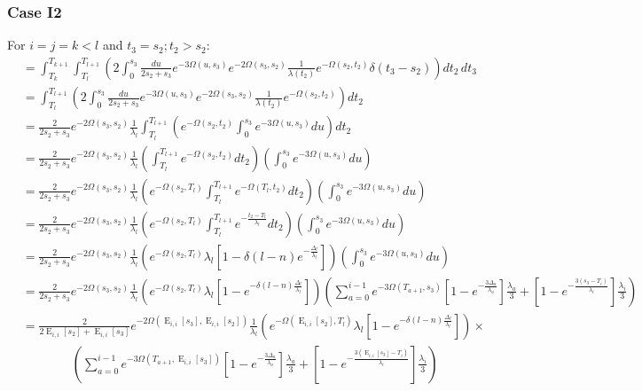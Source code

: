 \documentclass{article}
\DeclareMathOperator{\E}{E}
\begin{document}
\subsubsection{Case I2}
For $i=j=k<l$ and $t_3=s_2;t_2>s_2$:
\begin{align*}
    &=\int_{T_k}^{T_{k+1}}\int_{T_l}^{T_{l+1}}\left(
    2\int_0^{s_3}\frac{du}{2s_2+s_3}e^{-3\Omega(u,s_3)}e^{-2\Omega(s_3,s_2)}\frac{1}{\lambda(t_2)}e^{-\Omega(s_2,t_2)}\delta(t_3-s_2)
    \right)dt_2\,dt_3\\
    &=\int_{T_l}^{T_{l+1}}\left(
    2\int_0^{s_3}\frac{du}{2s_2+s_3}e^{-3\Omega(u,s_3)}e^{-2\Omega(s_3,s_2)}\frac{1}{\lambda(t_2)}e^{-\Omega(s_2,t_2)}
    \right)dt_2\\
    &=\frac{2}{2s_2+s_3}e^{-2\Omega(s_3,s_2)}\frac{1}{\lambda_l}
    \int_{T_l}^{T_{l+1}}\left(
    e^{-\Omega(s_2,t_2)}\int_0^{s_3}e^{-3\Omega(u,s_3)}du
    \right)dt_2\\
    &=\frac{2}{2s_2+s_3}e^{-2\Omega(s_3,s_2)}\frac{1}{\lambda_l}
    \left(\int_{T_l}^{T_{l+1}}e^{-\Omega(s_2,t_2)}dt_2\right)
    \left(\int_0^{s_3}e^{-3\Omega(u,s_3)}du\right)\\
    &=\frac{2}{2s_2+s_3}e^{-2\Omega(s_3,s_2)}\frac{1}{\lambda_l}
    \left(e^{-\Omega(s_2,T_l)}\int_{T_l}^{T_{l+1}}e^{-\Omega(T_l,t_2)}dt_2\right)
    \left(\int_0^{s_3}e^{-3\Omega(u,s_3)}du\right)\\
    &=\frac{2}{2s_2+s_3}e^{-2\Omega(s_3,s_2)}\frac{1}{\lambda_l}
    \left(e^{-\Omega(s_2,T_l)}\int_{T_l}^{T_{l+1}}e^{-\frac{t_2-T_l}{\lambda_l}}dt_2\right)
    \left(\int_0^{s_3}e^{-3\Omega(u,s_3)}du\right)\\
    &=\frac{2}{2s_2+s_3}e^{-2\Omega(s_3,s_2)}\frac{1}{\lambda_l}
    \left(e^{-\Omega(s_2,T_l)}\lambda_l\left[1-\delta(l-n)e^{-\frac{\Delta_l}{\lambda_l}}\right]\right)
    \left(\int_0^{s_3}e^{-3\Omega(u,s_3)}du\right)\\
    &=\frac{2}{2s_2+s_3}e^{-2\Omega(s_3,s_2)}\frac{1}{\lambda_l}
    \left(e^{-\Omega(s_2,T_l)}\lambda_l\left[1-e^{-\delta(l-n)\frac{\Delta_l}{\lambda_l}}\right]\right)
    \left(\sum_{a=0}^{i-1} e^{-3\Omega(T_{a+1},s_3)}
    \left[1-e^{-\frac{3 \Delta_a}{\lambda_a}}\right]\frac{\lambda_a}{3}+
    \left[1-e^{-\frac{3 \left(s_3-T_{i}\right)}{\lambda_{i}}}\right]\frac{\lambda_{i}}{3}\right)\\
    &=\frac{2}{2\E_{i,i}[s_2]+\E_{i,i}[s_3]}e^{-2\Omega(\E_{i,i}[s_3],\E_{i,i}[s_2])}\frac{1}{\lambda_l}
    \left(e^{-\Omega(\E_{i,i}[s_2],T_l)}\lambda_l\left[1-e^{-\delta(l-n)\frac{\Delta_l}{\lambda_l}}\right]\right)\times\\
    &\qquad\qquad\left(\sum_{a=0}^{i-1} e^{-3\Omega(T_{a+1},\E_{i,i}[s_3])}
    \left[1-e^{-\frac{3 \Delta_a}{\lambda_a}}\right]\frac{\lambda_a}{3}+
    \left[1-e^{-\frac{3 \left(\E_{i,i}[s_3]-T_{i}\right)}{\lambda_{i}}}\right]\frac{\lambda_{i}}{3}\right)\\
    \\
\end{align*}
\end{document}
